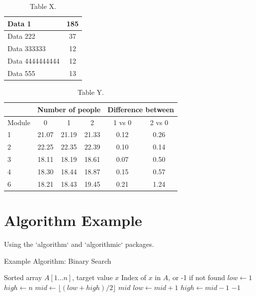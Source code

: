\documentclass{article} %
\begin{document}
\begin{table}[H]
    \centering
    \begin{tabular}{||l | c ||}
        \hline\hline
        Data 1 & 185\\
        \hline
        Data 222 & 37\\
        \hline
        Data 333333 & 12\\
        \hline
        Data 4444444444 & 12\\
        \hline
        Data 555 & 13\\
        \hline\hline
    \end{tabular}
    \caption{Table X.}
    \label{tab:table-x}
\end{table}

\begin{table}[H]
    \centering
    \begin{tabular}{||l || c | c | c | c | c ||}
        \hline\hline
        & \multicolumn{3}{c|}{Number of people} & \multicolumn{2}{c||}{Difference between}\\
        \hline
        Module & 0 & 1 & 2 & 1 vs 0 & 2 vs 0\\
        \hline\hline
        1 & 21.07 & 21.19 & 21.33 & 0.12 & 0.26\\
        \hline
        2 & 22.25 & 22.35 & 22.39 & 0.10 & 0.14\\
        \hline
        3 & 18.11 & 18.19 & 18.61 & 0.07 & 0.50\\
        \hline
        4 & 18.30 & 18.44 & 18.87 & 0.15 & 0.57\\
        \hline
        6 & 18.21 & 18.43 & 19.45 & 0.21 & 1.24\\
        \hline\hline
    \end{tabular}
    \caption{Table Y.}
    \label{tab:table-y}
\end{table}

\section{Algorithm Example}

Using the `algorithm` and `algorithmic` packages.

\begin{algorithm}[H]
\caption{Example Algorithm: Binary Search}
\label{alg:binary-search}
\begin{algorithmic}[1]
\REQUIRE Sorted array $A[1 \dots n]$, target value $x$
\ENSURE Index of $x$ in $A$, or -1 if not found
\STATE $low \gets 1$
\STATE $high \gets n$
    \STATE $mid \gets \lfloor (low + high) / 2 \rfloor$
        \RETURN $mid$
        \STATE $low \gets mid + 1$
    \ELSE
        \STATE $high \gets mid - 1$
    \ENDIF
\ENDWHILE
\RETURN $-1$
\end{algorithmic}
\end{algorithm}
\end{document}
